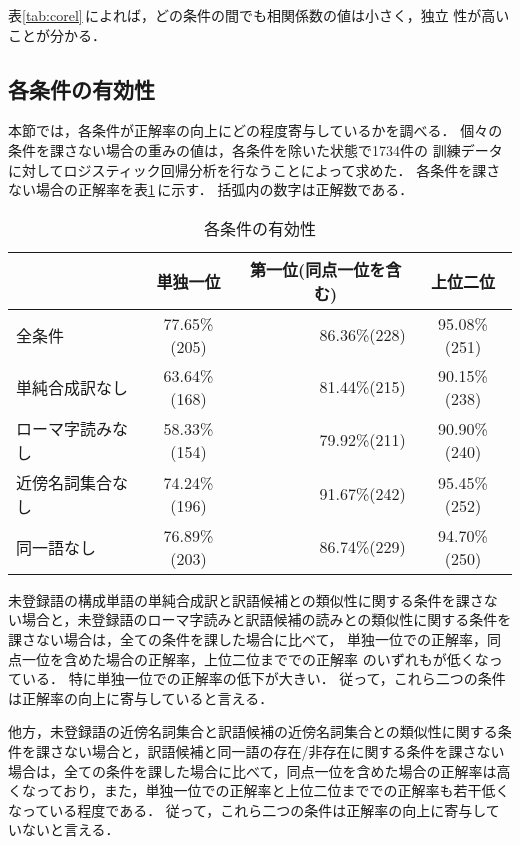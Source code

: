 表\ref{tab:corel}\,によれば，どの条件の間でも相関係数の値は小さく，独立
性が高いことが分かる．


\subsection{各条件の有効性}
\label{sec:experiment:effect}

本節では，各条件が正解率の向上にどの程度寄与しているかを調べる．
個々の条件を課さない場合の重みの値は，各条件を除いた状態で1734件の
訓練データに対してロジスティック回帰分析を行なうことによって求めた．
各条件を課さない場合の正解率を表\ref{tab:feats-effect}\,に示す．
括弧内の数字は正解数である．
\begin{table}[htbp]
\caption{各条件の有効性}
\label{tab:feats-effect}
\begin{center}
\begin{tabular}{|l||c|r|c|}\hline
                 & 単独一位     & \multicolumn{1}{c|}{第一位(同点一位を含む)} & 上位二位 \\\hline\hline
全条件           & 77.65\%(205) & 86.36\%(228) & 95.08\%(251) \\
単純合成訳なし   & 63.64\%(168) & 81.44\%(215) & 90.15\%(238) \\
ローマ字読みなし & 58.33\%(154) & 79.92\%(211) & 90.90\%(240) \\
近傍名詞集合なし & 74.24\%(196) & 91.67\%(242) & 95.45\%(252) \\
同一語なし       & 76.89\%(203) & 86.74\%(229) & 94.70\%(250) \\\hline
\end{tabular}
\end{center}
\end{table}

未登録語の構成単語の単純合成訳と訳語候補との類似性に関する条件を課さな
い場合と，未登録語のローマ字読みと訳語候補の読みとの類似性に関する条件を
課さない場合は，全ての条件を課した場合に比べて，
単独一位での正解率，同点一位を含めた場合の正解率，上位二位まででの正解率
のいずれもが低くなっている．
特に単独一位での正解率の低下が大きい．
従って，これら二つの条件は正解率の向上に寄与していると言える．

他方，未登録語の近傍名詞集合と訳語候補の近傍名詞集合との類似性に関する条
件を課さない場合と，訳語候補と同一語の存在/非存在に関する条件を課さない
場合は，全ての条件を課した場合に比べて，同点一位を含めた場合の正解率は高
くなっており，また，単独一位での正解率と上位二位まででの正解率も若干低く
なっている程度である．
従って，これら二つの条件は正解率の向上に寄与していないと言える．

